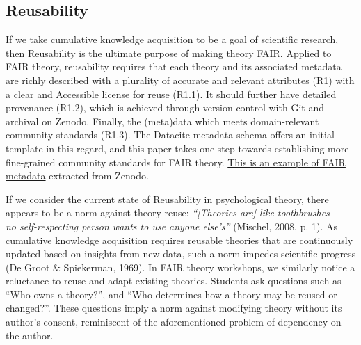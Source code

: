 \documentclass[
  man, noextraspace,floatsintext]{apa7}
\begin{document}
\subsection{Reusability}\label{reusability}

If we take cumulative knowledge acquisition to be a goal of scientific research, then Reusability is the ultimate purpose of making theory FAIR.
Applied to FAIR theory, reusability requires that each theory and its associated metadata are richly described with a plurality of accurate and relevant attributes (R1) with a clear and Accessible license for reuse (R1.1).
It should further have detailed provenance (R1.2),
which is achieved through version control with Git and archival on Zenodo.
Finally, the (meta)data which meets domain-relevant community standards (R1.3).
The Datacite metadata schema offers an initial template in this regard,
and this paper takes one step towards establishing more fine-grained community standards for FAIR theory.
\href{https://raw.githubusercontent.com/cjvanlissa/fair_theory/refs/heads/main/example_metadata.json}{This is an example of FAIR metadata} extracted from Zenodo.

If we consider the current state of Reusability in psychological theory, there appears to be a norm against theory reuse:
\emph{``{[}Theories are{]} like toothbrushes --- no self-respecting person wants to use anyone else's''} (Mischel, 2008, p. 1).
As cumulative knowledge acquisition requires reusable theories that are continuously updated based on insights from new data, such a norm impedes scientific progress (De Groot \& Spiekerman, 1969).
In FAIR theory workshops, we similarly notice a reluctance to reuse and adapt existing theories.
Students ask questions such as ``Who owns a theory?'',
and ``Who determines how a theory may be reused or changed?''.
These questions imply a norm against modifying theory without its author's consent, reminiscent of the aforementioned problem of dependency on the author.
\end{document}
